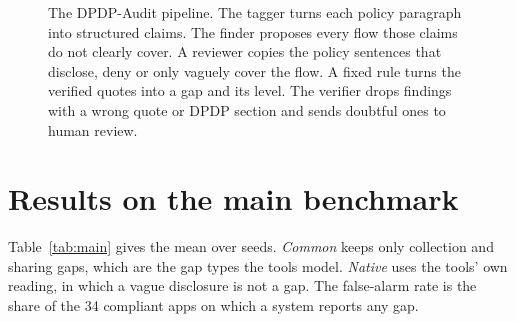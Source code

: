 \documentclass[11pt,a4paper]{article}
\begin{document}
\begin{figure}[H]
\centering
{}
\caption{The DPDP-Audit pipeline. The tagger turns each policy paragraph into structured claims.
The finder proposes every flow those claims do not clearly cover. A reviewer copies the policy
sentences that disclose, deny or only vaguely cover the flow. A fixed rule turns the verified
quotes into a gap and its level. The verifier drops findings with a wrong quote or DPDP section and
sends doubtful ones to human review.}
\end{figure}

\section{Results on the main benchmark}

Table~\ref{tab:main} gives the mean over seeds. \emph{Common} keeps only collection and sharing
gaps, which are the gap types the tools model. \emph{Native} uses the tools' own reading, in which a
vague disclosure is not a gap. The false-alarm rate is the share of the 34 compliant apps on which a
system reports any gap.
\end{document}
